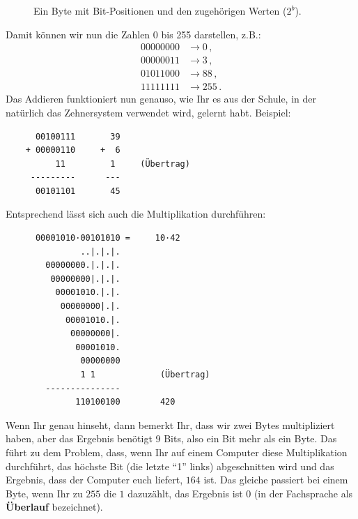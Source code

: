 \begin{figure}[h]
  \centering
  \caption{Ein Byte mit Bit-Positionen und den zugehörigen Werten ($2^b$).}
  \label{fig:byte-values}
\end{figure}

\noindent
Damit können wir nun die Zahlen 0 bis 255 darstellen, z.B.:
\begin{align*}
  00000000 &\rightarrow 0\,, \\
  00000011 &\rightarrow 3\,, \\
  01011000 &\rightarrow 88\,, \\
  11111111 &\rightarrow 255\,.
\end{align*}
Das Addieren funktioniert nun genauso, wie Ihr es aus der Schule, in der natürlich das Zehnersystem verwendet wird, gelernt habt. Beispiel:
\begin{lstlisting}
      00100111       39
    + 00000110     +  6
          11         1     (Übertrag)
     ---------      ---
      00101101       45
\end{lstlisting}
Entsprechend lässt sich auch die Multiplikation durchführen:
\begin{lstlisting}
      00001010·00101010 =     10·42
               ..|.|.|.
        00000000.|.|.|.
         00000000|.|.|.
          00001010.|.|.
           00000000|.|.
            00001010.|.
             00000000|.
              00001010.
               00000000
               1 1             (Übertrag)
        ---------------
              110100100        420
\end{lstlisting}
Wenn Ihr genau hinseht, dann bemerkt Ihr, dass wir zwei Bytes multipliziert haben, aber das Ergebnis benötigt 9 Bits, also ein Bit mehr als ein Byte. Das führt zu dem Problem, dass, wenn Ihr auf einem Computer diese Multiplikation durchführt, das höchste Bit (die letzte ``1'' links) abgeschnitten wird und das Ergebnis, dass der Computer euch liefert, $164$ ist. Das gleiche passiert bei einem Byte, wenn Ihr zu $255$ die $1$ dazuzählt, das Ergebnis ist $0$ (in der Fachsprache als \textbf{Überlauf} bezeichnet).

